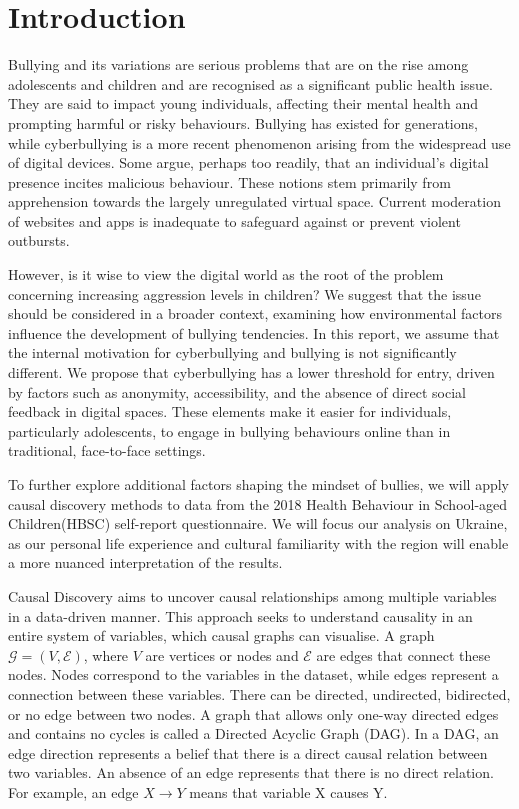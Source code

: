 \documentclass[main.tex]{subfiles}
\begin{document}
\section{Introduction}
Bullying and its variations are serious problems that are on the rise among adolescents and children \cite{Zhu2021} and are recognised as a significant public health issue. They are said to impact young individuals, affecting their mental health and prompting harmful or risky behaviours. Bullying has existed for generations, while cyberbullying is a more recent phenomenon arising from the widespread use of digital devices. Some argue, perhaps too readily, that an individual's digital presence incites malicious behaviour. These notions stem primarily from apprehension towards the largely unregulated virtual space. Current moderation of websites and apps is inadequate to safeguard against or prevent violent outbursts.

However, is it wise to view the digital world as the root of the problem concerning increasing aggression levels in children? We suggest that the issue should be considered in a broader context, examining how environmental factors influence the development of bullying tendencies. 
In this report, we assume that the internal motivation for cyberbullying and bullying is not significantly different. We propose that cyberbullying has a lower threshold for entry, driven by factors such as anonymity, accessibility, and the absence of direct social feedback in digital spaces. These elements make it easier for individuals, particularly adolescents, to engage in bullying behaviours online than in traditional, face-to-face settings. 

To further explore additional factors shaping the mindset of bullies, we will apply causal discovery methods to data from the 2018 Health Behaviour in School-aged Children(HBSC) self-report questionnaire. We will focus our analysis on Ukraine, as our personal life experience and cultural familiarity with the region will enable a more nuanced interpretation of the results. 

Causal Discovery aims to uncover causal relationships among multiple variables in a data-driven manner. This approach seeks to understand causality in an entire system of variables, which causal graphs can visualise. A graph $\mathcal{G} = (V, \mathcal{E})$, where $V$ are vertices or nodes and $\mathcal{E}$ are edges that connect these nodes. Nodes correspond to the variables in the dataset, while edges represent a connection between these variables. There can be directed, undirected, bidirected, or no edge between two nodes. A graph that allows only one-way directed edges and contains no cycles is called a Directed Acyclic Graph (DAG). In a DAG, an edge direction represents a belief that there is a direct causal relation between two variables. An absence of an edge represents that there is no direct relation. For example, an edge $X \rightarrow Y$ means that variable X causes Y.
\end{document}
